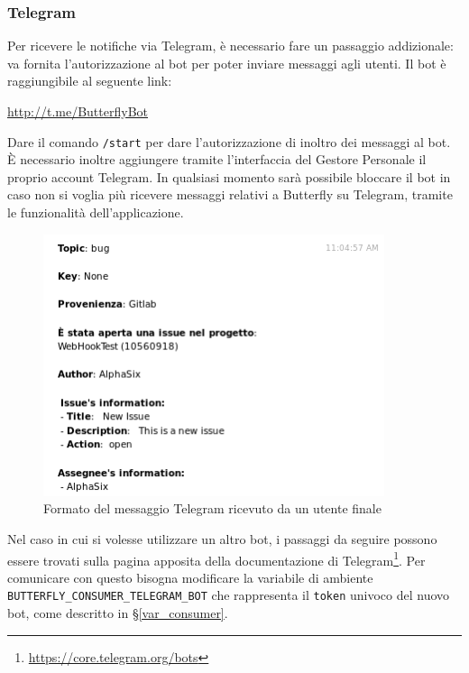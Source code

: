 \subsubsection{Telegram}

Per ricevere le notifiche via Telegram, è necessario fare un passaggio addizionale: va fornita l'autorizzazione al bot per poter inviare messaggi agli utenti.
Il bot è raggiungibile al seguente link:
\begin{center}
    \url{http://t.me/ButterflyBot}
\end{center}

Dare il comando \texttt{/start} per dare l'autorizzazione di inoltro dei messaggi al bot.
È necessario inoltre aggiungere tramite l'interfaccia del Gestore Personale il proprio account Telegram.
In qualsiasi momento sarà possibile bloccare il bot in caso non si voglia più ricevere messaggi relativi a Butterfly su Telegram, tramite le funzionalità dell'applicazione.
\begin{figure}[H]
	\centering
	\includegraphics[width=10cm]{img/notifica_telegram_1.png}
	\caption{Formato del messaggio Telegram ricevuto da un utente finale}
\end{figure}
Nel caso in cui si volesse utilizzare un altro bot, i passaggi da seguire possono essere trovati sulla pagina apposita della documentazione di Telegram\footnote{\url{https://core.telegram.org/bots}}.
Per comunicare con questo bisogna modificare la variabile di ambiente \texttt{BUTTERFLY\_CONSUMER\_TELEGRAM\_BOT} che rappresenta il \texttt{token} univoco del nuovo bot, come descritto in \S\ref{var_consumer}.
